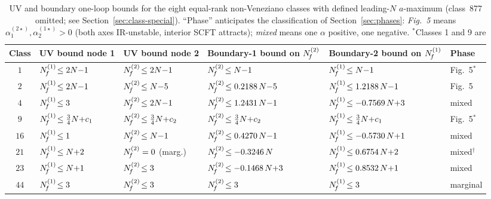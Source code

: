 \begin{table}[h]
  \centering
  \small
  \renewcommand{\arraystretch}{1.18}
  \setlength{\tabcolsep}{4pt}
  \begin{tabular}{clllll}
    \toprule
    Class & UV bound node 1
          & UV bound node 2
          & Boundary-1 bound on $N_{\!f}^{(2)}$
          & Boundary-2 bound on $N_{\!f}^{(1)}$
          & Phase \\
    \midrule
    $1$   & $N_{\!f}^{(1)}\!\le 2N{-}1$    & $N_{\!f}^{(2)}\!\le 2N{-}1$
          & $N_{\!f}^{(2)}\!\le N{-}1$     & $N_{\!f}^{(1)}\!\le N{-}1$
          & Fig.~5$^{\ast}$ \\
    $2$   & $N_{\!f}^{(1)}\!\le 2N{-}1$    & $N_{\!f}^{(2)}\!\le N{-}5$
          & $N_{\!f}^{(2)}\!\le 0.2188\,N{-}5$ & $N_{\!f}^{(1)}\!\le 1.2188\,N{-}1$
          & Fig.~5 \\
    $4$   & $N_{\!f}^{(1)}\!\le 3$         & $N_{\!f}^{(2)}\!\le 2N{-}1$
          & $N_{\!f}^{(2)}\!\le 1.2431\,N{-}1$ & $N_{\!f}^{(1)}\!\le -0.7569\,N{+}3$
          & mixed \\
    $9$   & $N_{\!f}^{(1)}\!\le \tfrac34 N{+}c_{1}$ & $N_{\!f}^{(2)}\!\le \tfrac34 N{+}c_{2}$
          & $N_{\!f}^{(2)}\!\le \tfrac34 N{+}c_{2}$ & $N_{\!f}^{(1)}\!\le \tfrac34 N{+}c_{1}$
          & Fig.~5$^{\ast}$ \\
    $16$  & $N_{\!f}^{(1)}\!\le 1$         & $N_{\!f}^{(2)}\!\le N{-}1$
          & $N_{\!f}^{(2)}\!\le 0.4270\,N{-}1$ & $N_{\!f}^{(1)}\!\le -0.5730\,N{+}1$
          & mixed \\
    $21$  & $N_{\!f}^{(1)}\!\le N{+}2$     & $N_{\!f}^{(2)}=0$ (marg.)
          & $N_{\!f}^{(2)}\!\le -0.3246\,N$    & $N_{\!f}^{(1)}\!\le 0.6754\,N{+}2$
          & mixed$^{\dagger}$ \\
    $23$  & $N_{\!f}^{(1)}\!\le N{+}1$     & $N_{\!f}^{(2)}\!\le 3$
          & $N_{\!f}^{(2)}\!\le -0.1468\,N{+}3$ & $N_{\!f}^{(1)}\!\le 0.8532\,N{+}1$
          & mixed \\
    $44$  & $N_{\!f}^{(1)}\!\le 3$         & $N_{\!f}^{(2)}\!\le 3$
          & $N_{\!f}^{(2)}\!\le 3$         & $N_{\!f}^{(1)}\!\le 3$
          & marginal \\
    \bottomrule
  \end{tabular}
  \caption{UV and boundary one-loop bounds for the eight equal-rank
    non-Veneziano classes with defined leading-$N$ $a$-maximum
    (class~877 omitted; see Section~\ref{sec:class-special}).
    ``Phase'' anticipates the classification of
    Section~\ref{sec:phases}: \emph{Fig.~5} means
    $\alpha_{1}^{(2\star)},\alpha_{2}^{(1\star)}>0$ (both axes
    IR-unstable, interior SCFT attracts); \emph{mixed} means one
    $\alpha$ positive, one negative.  $^{\ast}$Classes 1 and 9 are
}
\end{table}
